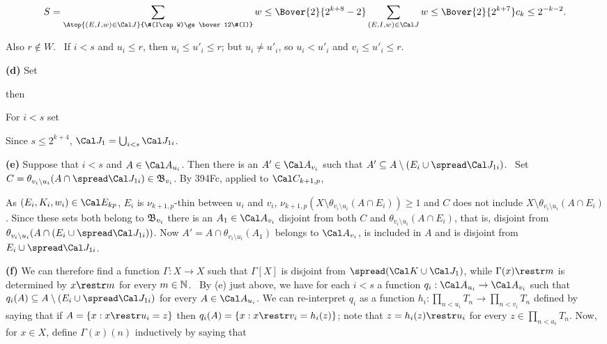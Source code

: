 {$$S
=\sum_{\Atop{(E,I,w)\in\Cal J}{\#(I\cap W)\ge\bover12\#(I)}}w
\le\Bover{2}{2^{k+8}-2}\sum_{(E,I,w)\in\Cal J}w
\le\Bover{2}{2^{k+7}}c_k
\le 2^{-k-2}.$$

\noindent Also $r\notin W$.  \Prf\ If $i<s$ and $u_i\le r$, then 
$u_i\le u'_i\le r$;  but $u_i\ne u'_i$, so $u_i<u'_i$ and
$v_i\le u'_i\le r$.\ \Qed

\medskip

{\bf (d)} Set


\noindent then


\noindent For $i<s$ set


\noindent Since $s\le 2^{k+4}$, $\Cal J_1=\bigcup_{i<s}\Cal J_{1i}$.

\medskip

{\bf (e)} Suppose that $i<s$ and $A\in\Cal A_{u_i}$.
Then there is an $A'\in\Cal A_{v_i}$ such that
$A'\subseteq A\setminus(E_i\cup\spread\Cal J_{1i})$.   \Prf\   Set
$C=\theta_{v_i\setminus u_i}(A\cap\spread\Cal J_{1i})\in\frak B_{v_i}$.
By 394Fc, applied to $\Cal C_{k+1,p}$,


\noindent As $(E_i,K_i,w_i)\in\Cal E_{kp}$,
$E_i$ is $\nu_{k+1,p}$-thin between $u_i$ and $v_i$,
$\nu_{k+1,p}(X\setminus\theta_{v_i\setminus u_i}(A\cap E_i))\ge 1$ and
$C$ does not include $X\setminus\theta_{v_i\setminus u_i}(A\cap E_i)$.
Since these sets both belong to $\frak B_{v_i}$
there is an $A_1\in\Cal A_{v_i}$ disjoint from both $C$ and
$\theta_{v_i\setminus u_i}(A\cap E_i)$, that is, disjoint from
$\theta_{v_i\setminus u_i}(A\cap(E_i\cup\spread\Cal J_{1i}))$.
Now $A'=A\cap\theta_{v_i\setminus u_i}(A_1)$
belongs to $\Cal A_{v_i}$, is included in $A$
and is disjoint from $E_i\cup\spread\Cal J_{1i}$.\ \Qed

\medskip

{\bf (f)} We can therefore find a function $\Gamma:X\to X$ such that
$\Gamma[X]$ is disjoint from $\spread(\Cal K\cup\Cal J_1)$, while
$\Gamma(x)\restr m$ is determined by $x\restr m$ for every $m\in\Bbb N$.
\Prf\ By (e) just above, we have for each $i<s$
a function $q_i:\Cal A_{u_i}\to\Cal A_{v_i}$
such that $q_i(A)\subseteq A\setminus(E_i\cup\spread\Cal J_{1i})$ for every
$A\in\Cal A_{u_i}$.   We can re-interpret $q_i$ as a function
$h_i:\prod_{n<u_i}T_n\to\prod_{n<v_i}T_n$ defined by saying that if
$A=\{x:x\restr u_i=z\}$ then $q_i(A)=\{x:x\restr v_i=h_i(z)\}$;  note that
$z=h_i(z)\restr u_i$ for every $z\in\prod_{n<u_i}T_n$.
Now, for $x\in X$, define $\Gamma(x)(n)$ inductively by saying that

}
